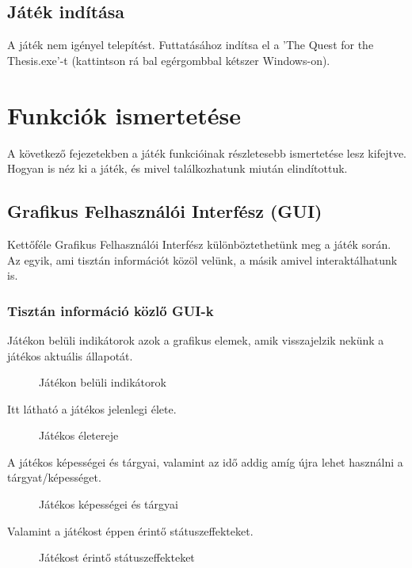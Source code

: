 \subsection{Játék indítása}
A játék nem igényel telepítést. Futtatásához indítsa el a 'The Quest for the Thesis.exe'-t (kattintson rá bal egérgombbal kétszer Windows-on).

\cleardoublepage
\section{Funkciók ismertetése}
A következő fejezetekben a játék funkcióinak részletesebb ismertetése lesz kifejtve. Hogyan is néz ki a játék, és mivel találkozhatunk miután elindítottuk.

\subsection{Grafikus Felhasználói Interfész (GUI)}
Kettőféle Grafikus Felhasználói Interfész különböztethetünk meg a játék során. Az egyik, ami tisztán információt közöl velünk, a másik amivel interaktálhatunk is.
\subsubsection{Tisztán információ közlő GUI-k}
Játékon belüli indikátorok azok a grafikus elemek, amik visszajelzik nekünk a játékos aktuális állapotát. 
\begin{figure}[htb]
	\noindent{}
	\caption{Játékon belüli indikátorok}
	\label{inUse}
\end{figure}

Itt látható a játékos jelenlegi élete.
\begin{figure}[htb]
	\noindent{}
	\caption{Játékos életereje}
	\label{inUseHealth}
\end{figure}

A játékos képességei és tárgyai, valamint az idő addig amíg újra lehet használni a tárgyat/képességet.
\begin{figure}[htb]
	\noindent{}
	\caption{Játékos képességei és tárgyai}
	\label{inUseItems}
\end{figure}

Valamint a játékost éppen érintő státuszeffekteket.
\begin{figure}[htb]
	\noindent{}
	\caption{Játékost érintő státuszeffekteket}
	\label{inUseStatuses}
\end{figure}


